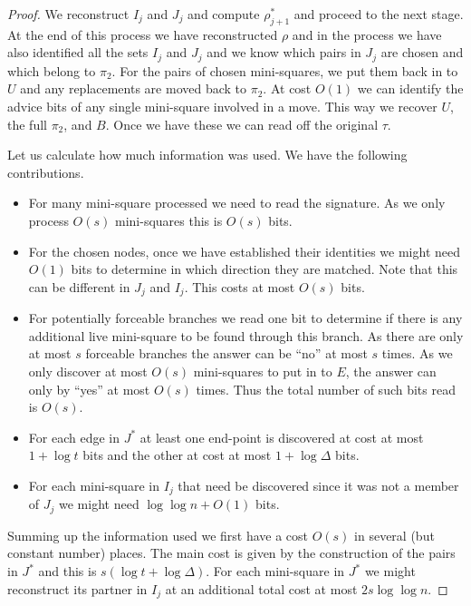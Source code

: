 \documentclass{article}\usepackage[a4paper,margin=20mm]{geometry}
\begin{document}
\begin{proof}
We reconstruct $I_j$ and $J_j$ and
compute $\rho_{j+1}^*$ and proceed to the next
stage.  At the end of this process we have reconstructed
$\rho$ and in the process we have also identified
all the sets $I_j$ and $J_j$ and we know which pairs
in $J_j$ are chosen and which belong to $\pi_2$.  For the 
pairs of chosen mini-squares, we put them back in to $U$ and
any replacements are moved back to $\pi_2$.  At cost
$O(1)$ we can identify the advice bits of any single
mini-square involved in a move.  This way we recover $U$,
the full $\pi_2$, and $B$.  Once we have these
we can read off the original $\tau$.

Let us calculate how much information
was used.  We have the following contributions.

\begin{itemize}

\item For many mini-square processed we need to
read the signature.  As we only process $O(s)$
mini-squares this is $O(s)$ bits.

\item For the chosen nodes, once we have
established their identities we might need $O(1)$
bits to determine in which direction they are matched.
Note that this can be different in $J_j$ and $I_j$.
This costs at most $O(s)$ bits.

\item For potentially forceable  branches
we read one bit to determine if there is any
additional live mini-square to be found through this branch.
As there are only at most $s$ forceable branches
the answer can be ``no'' at most $s$ times.
As we only discover at most $O(s)$ mini-squares to
put in to $E$, the answer can only by ``yes'' at most $O(s)$ times.
Thus the total number of such bits read is $O(s)$.

\item  For each edge in $J^*$ at least one
end-point is discovered at cost at most $1+\log t$ bits and
the other at cost at most $1+\log \Delta$ bits.

\item For each  mini-square in $I_j$ that need
be discovered since it was not a member of $J_j$
we might need $\log \log n+O(1)$ bits.

\end{itemize}
Summing up the information used we first have
a cost $O(s)$ in several (but constant number) 
places.  The main cost is given by the construction of the
pairs in $J^*$ and this is $s(\log t + \log \Delta)$.
For each mini-square in $J^*$ we might reconstruct
its partner in $I_j$ at an additional total cost 
at most $2s \log \log n$.


\end{proof}
\end{document}
